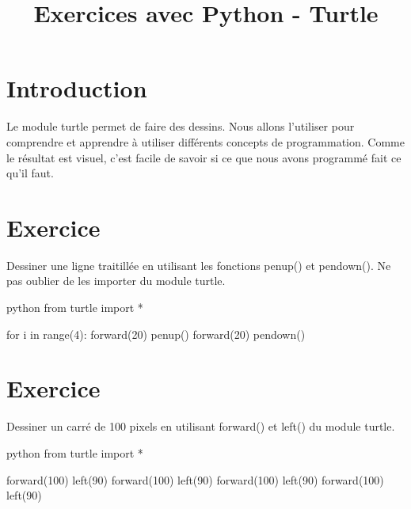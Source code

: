 \documentclass[a4paper,11pt]{article}
\begin{document}
\title{Exercices avec Python - Turtle}
\date{}
\maketitle

\section{Introduction}
Le module turtle permet de faire des dessins. Nous allons l'utiliser pour comprendre et apprendre à utiliser différents concepts de programmation. Comme le résultat est visuel, c'est facile de savoir si ce que nous avons programmé fait ce qu'il faut.

\section{Exercice}
Dessiner une ligne traitillée en utilisant les fonctions penup() et pendown(). Ne pas oublier de les importer du module turtle.
\begin{solution}
\begin{code}{python}
from turtle import *

for i in range(4):
    forward(20)
    penup()
    forward(20)
    pendown()
\end{code}
\end{solution}

\section{Exercice}
Dessiner un carré de 100 pixels en utilisant forward() et left() du module turtle.
\begin{solution}
\begin{code}{python}
from turtle import *

forward(100)
left(90)
forward(100)
left(90)
forward(100)
left(90)
forward(100)
left(90)
\end{code}
\end{solution}
\end{document}
